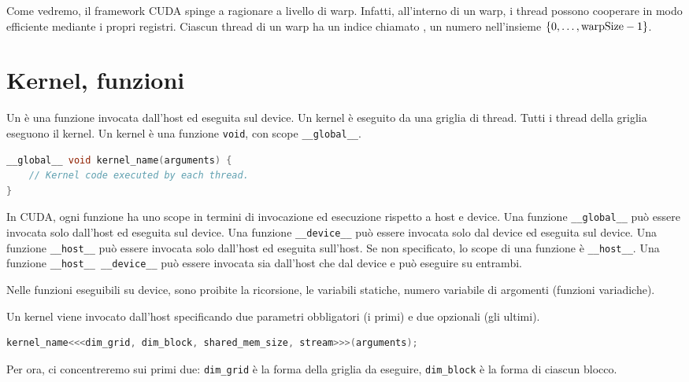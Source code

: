 Come vedremo, il framework CUDA spinge a ragionare a livello di warp.
Infatti, all'interno di un warp, i thread possono cooperare in modo efficiente mediante i propri registri.
Ciascun thread di un warp ha un indice chiamato , un numero nell'insieme \(\set{0, \ldots, \text{warpSize}-1}\).

\section{Kernel, funzioni}
Un  è una funzione invocata dall'host ed eseguita sul device. Un kernel è eseguito da una griglia di thread. Tutti i thread della griglia eseguono il kernel.
Un kernel è una funzione \texttt{void}, con scope \texttt{\_\_global\_\_}.

\begin{lstlisting}[language=C++, numbers=none]
__global__ void kernel_name(arguments) {
    // Kernel code executed by each thread.
}
\end{lstlisting}

In CUDA, ogni funzione ha uno scope in termini di invocazione ed esecuzione rispetto a host e device.
Una funzione \texttt{\_\_global\_\_} può essere invocata solo dall'host ed eseguita sul device.
Una funzione \texttt{\_\_device\_\_} può essere invocata solo dal device ed eseguita sul device.
Una funzione \texttt{\_\_host\_\_} può essere invocata solo dall'host ed eseguita sull'host.
Se non specificato, lo scope di una funzione è \texttt{\_\_host\_\_}.
Una funzione \texttt{\_\_host\_\_ \_\_device\_\_} può essere invocata sia dall'host che dal device e può eseguire su entrambi.

\begin{note}{}
    Nelle funzioni eseguibili su device, sono proibite la ricorsione, le variabili statiche, numero variabile di argomenti (funzioni variadiche).
\end{note}

Un kernel viene invocato dall'host specificando due parametri obbligatori (i primi) e due opzionali (gli ultimi).

\begin{lstlisting}[language=C++, numbers=none]
kernel_name<<<dim_grid, dim_block, shared_mem_size, stream>>>(arguments);
\end{lstlisting}

Per ora, ci concentreremo sui primi due: \texttt{dim\_grid} è la forma della griglia da eseguire, \texttt{dim\_block} è la forma di ciascun blocco.

